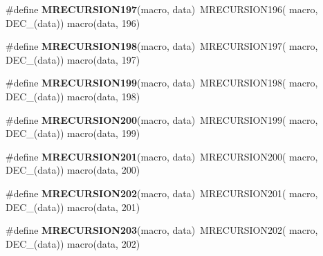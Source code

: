 \begin{DoxyCompactItemize}
\item 
\hypertarget{group__group__sam0__utils__mrecursion_gae419c59f8b191d6b6dd3c3c3e94448b6}{}\#define {\bfseries M\+R\+E\+C\+U\+R\+S\+I\+O\+N197}(macro,  data)~M\+R\+E\+C\+U\+R\+S\+I\+O\+N196(  macro, D\+E\+C\+\_\+(data))   macro(data, 196)\label{group__group__sam0__utils__mrecursion_gae419c59f8b191d6b6dd3c3c3e94448b6}

\item 
\hypertarget{group__group__sam0__utils__mrecursion_gae809796894cf07b1f6d2c9e04b473764}{}\#define {\bfseries M\+R\+E\+C\+U\+R\+S\+I\+O\+N198}(macro,  data)~M\+R\+E\+C\+U\+R\+S\+I\+O\+N197(  macro, D\+E\+C\+\_\+(data))   macro(data, 197)\label{group__group__sam0__utils__mrecursion_gae809796894cf07b1f6d2c9e04b473764}

\item 
\hypertarget{group__group__sam0__utils__mrecursion_gae1ce17a67961e22bff5e4b9e20f128f0}{}\#define {\bfseries M\+R\+E\+C\+U\+R\+S\+I\+O\+N199}(macro,  data)~M\+R\+E\+C\+U\+R\+S\+I\+O\+N198(  macro, D\+E\+C\+\_\+(data))   macro(data, 198)\label{group__group__sam0__utils__mrecursion_gae1ce17a67961e22bff5e4b9e20f128f0}

\item 
\hypertarget{group__group__sam0__utils__mrecursion_ga813c3af979e8abfb90f9ca68f7f58a78}{}\#define {\bfseries M\+R\+E\+C\+U\+R\+S\+I\+O\+N200}(macro,  data)~M\+R\+E\+C\+U\+R\+S\+I\+O\+N199(  macro, D\+E\+C\+\_\+(data))   macro(data, 199)\label{group__group__sam0__utils__mrecursion_ga813c3af979e8abfb90f9ca68f7f58a78}

\item 
\hypertarget{group__group__sam0__utils__mrecursion_gae71cc85e09f54c620d59f8d24adae37f}{}\#define {\bfseries M\+R\+E\+C\+U\+R\+S\+I\+O\+N201}(macro,  data)~M\+R\+E\+C\+U\+R\+S\+I\+O\+N200(  macro, D\+E\+C\+\_\+(data))   macro(data, 200)\label{group__group__sam0__utils__mrecursion_gae71cc85e09f54c620d59f8d24adae37f}

\item 
\hypertarget{group__group__sam0__utils__mrecursion_ga9c8159e1c24ea9666a9840a4ae05c20a}{}\#define {\bfseries M\+R\+E\+C\+U\+R\+S\+I\+O\+N202}(macro,  data)~M\+R\+E\+C\+U\+R\+S\+I\+O\+N201(  macro, D\+E\+C\+\_\+(data))   macro(data, 201)\label{group__group__sam0__utils__mrecursion_ga9c8159e1c24ea9666a9840a4ae05c20a}

\item 
\hypertarget{group__group__sam0__utils__mrecursion_ga443a104f6a9c261eb7f07f7103820e5a}{}\#define {\bfseries M\+R\+E\+C\+U\+R\+S\+I\+O\+N203}(macro,  data)~M\+R\+E\+C\+U\+R\+S\+I\+O\+N202(  macro, D\+E\+C\+\_\+(data))   macro(data, 202)\label{group__group__sam0__utils__mrecursion_ga443a104f6a9c261eb7f07f7103820e5a}


\end{DoxyCompactItemize}
